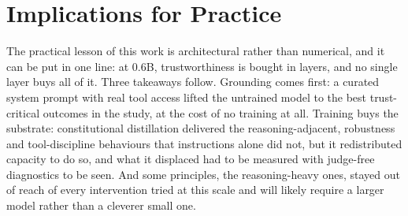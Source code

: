 
\section{Implications for Practice}
\label{sec:implications-practice}

The practical lesson of this work is architectural rather than numerical, and it can be put in one line: at 0.6B, trustworthiness is bought in layers, and no single layer buys all of it. Three takeaways follow. Grounding comes first: a curated system prompt with real tool access lifted the untrained model to the best trust-critical outcomes in the study, at the cost of no training at all. Training buys the substrate: constitutional distillation delivered the reasoning-adjacent, robustness and tool-discipline behaviours that instructions alone did not, but it redistributed capacity to do so, and what it displaced had to be measured with judge-free diagnostics to be seen. And some principles, the reasoning-heavy ones, stayed out of reach of every intervention tried at this scale and will likely require a larger model rather than a cleverer small one.

